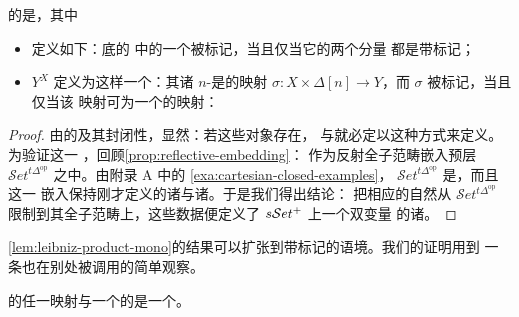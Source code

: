 \begin{proposition}\label{prop:marked-cartesian-closed}
\trMarkedSimplicialSet{}的\trCategory{}是\trCartesianClosed，其中
\begin{itemize}
\item \trCartesianProduct{}定义如下：底\trSimplicialSet{}的%
  \trCartesianProduct{}中的一个\trSimplex{}被标记，当且仅当它的两个分量
  都是带标记\trSimplex；
\item \trInternalHom{} $Y^{X}$ 定义为这样一个\trSimplicialSet：其诸
  $n$-\trSimplex{}是\trMarkedSimplicialSet{}的映射
  $\sigma\colon X\times\Delta[n]\to Y$，而 $\sigma$ 被标记，当且仅当该
  映射可\trExtension{}为一个\trMarkedSimplicialSet{}的映射：
\begin{center}
\end{center}
\end{itemize}
\end{proposition}

\begin{proof}
由\trProduct{}的\trUniversalProperty{}及其封闭性，显然：若这些对象存在，
\trCartesianProduct{}与\trInternalHom{}就必定以这种方式来定义。为验证这一%
\trAdjunction，回顾\cref{prop:reflective-embedding}：\trMarkedSimplicialSet{}%
作为反射全子范畴嵌入预层\trCategory{}
$\mathcal{S}et^{t\Delta^{\mathrm{op}}}$ 之中。由附录 A 中的%
\cref{exa:cartesian-closed-examples}，\trCategory{}
$\mathcal{S}et^{t\Delta^{\mathrm{op}}}$ 是\trCartesianClosed，而且这一
嵌入保持刚才定义的诸\trProduct{}与诸\trInternalHom{}。于是我们得出结论：
把相应的自然\trIsomorphism{}从 $\mathcal{S}et^{t\Delta^{\mathrm{op}}}$
限制到其全子范畴上，这些数据便定义了 $s\mathcal{S}et^{+}$ 上一个双变量\trAdjunction{}%
的诸\trFunctor。
\end{proof}

\cref{lem:leibniz-product-mono}的结果可以扩张到带标记的语境。我们的证明用到
一条也在别处被调用的简单观察。

\begin{lemma}\label{lem:leibniz-entire}
\trMarkedSimplicialSet{}的任一映射与一个\trEntireInclusion{}的\trLeibnizProduct{}是一个\trEntireInclusion。
\end{lemma}

